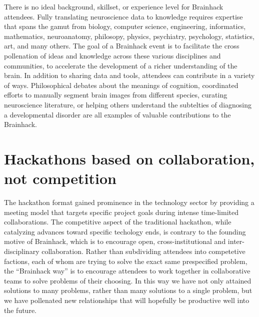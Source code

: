 \documentclass[11pt]{bmc_article_s50}
\begin{document}
There is no ideal background, skillset, or experience level for Brainhack
attendees. Fully translating neuroscience data to knowledge requires
expertise that spans the gamut from biology, computer science,
engineering, informatics, mathematics, neuroanatomy, philosopy, physics,
psychiatry, psychology, statistics, art, and many others. The goal of
a Brainhack event is to facilitate the cross pollenation of ideas and
knowledge across these various disciplines and communities, to
accelerate the development of a richer understanding of the brain. In
addition to sharing data and tools, attendees can contribute in a variety 
of ways. Philosophical debates about the meanings of cognition, coordinated 
efforts to manually segment brain images from different species, curating 
neuroscience literature, or helping others understand the subtelties of 
diagnosing a developmental disorder are all examples of valuable 
contributions to the Brainhack.

\section{Hackathons based on collaboration, not
competition}\label{hackathons-based-on-collaboration-not-competition}

The hackathon format gained prominence in the technology sector by
providing a meeting model that targets specific project goals during
intense time-limited collaborations. The competitive aspect of the
traditional hackathon, while catalyzing advances toward specific
techology ends, is contrary to the founding motive of Brainhack, which
is to encourage open, cross-institutional and inter-disciplinary
collaboration. Rather than subdividing attendees into competetive
factions, each of whom are trying to solve the exact same prespecified
problem, the ``Brainhack way'' is to encourage attendees to work
together in collaborative teams to solve problems of their choosing. In
this way we have not only attained solutions to many problems, rather
than many solutions to a single problem, but we have pollenated new
relationships that will hopefully be productive well into the future.
\end{document}
